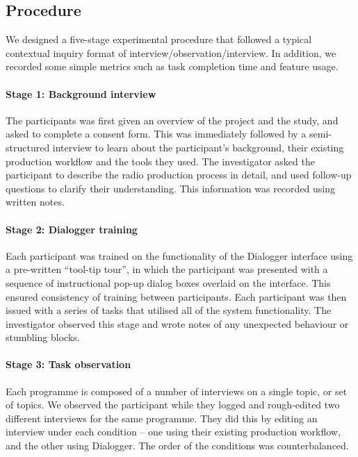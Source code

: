 \subsection{Procedure}
We designed a five-stage experimental procedure that followed a typical contextual inquiry format of
interview/observation/interview. In addition, we recorded some simple metrics such as task completion time and feature
usage.

\paragraph{Stage 1: Background interview}
    The participants was first given an overview of the project and the study, and asked to complete a consent form. This
    was immediately followed by a semi-structured interview to learn about the participant's background, their existing
    production workflow and the tools they used. The investigator asked the participant to describe the
    radio production process in detail, and used follow-up questions to clarify their understanding. This information
    was recorded using written notes.

\paragraph{Stage 2: Dialogger training}
    Each participant was trained on the functionality of the Dialogger interface using a pre-written ``tool-tip tour'',
    in which the participant was presented with a sequence of instructional pop-up dialog boxes overlaid on the
    interface.  This ensured consistency of training between participants. Each participant was then issued with a
    series of tasks that utilised all of the system functionality. The investigator observed this stage and wrote notes
    of any unexpected behaviour or stumbling blocks.

\paragraph{Stage 3: Task observation}
    Each programme is composed of a number of interviews
    on a single topic, or set of topics.  We observed the participant while they logged and rough-edited two
    different interviews for the same programme. They did this by editing an interview under each condition -- one
    using their existing production workflow, and the other using Dialogger. The order of the conditions was
    counterbalanced.

